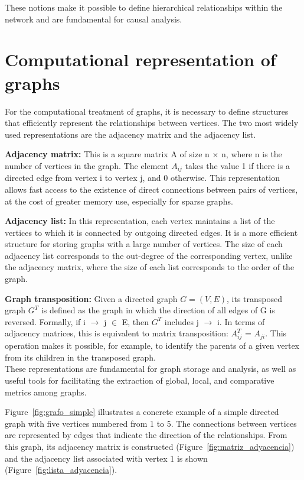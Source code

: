 \documentclass[12pt,a4paper]{report}
\begin{document}
These notions make it possible to define hierarchical relationships within the network and are fundamental for causal analysis.

\section{Computational representation of graphs}
	
For the computational treatment of graphs, it is necessary to define structures that efficiently represent the relationships between vertices. The two most widely used representations are the adjacency matrix and the adjacency list.

\textbf{Adjacency matrix:} This is a square matrix A of size n $\times$ n, where n is the number of vertices in the graph. The element $A_{ij}$ takes the value 1 if there is a directed edge from vertex i to vertex j, and 0 otherwise. This representation allows fast access to the existence of direct connections between pairs of vertices, at the cost of greater memory use, especially for sparse graphs.

\textbf{Adjacency list:} In this representation, each vertex maintains a list of the vertices to which it is connected by outgoing directed edges. It is a more efficient structure for storing graphs with a large number of vertices. The size of each adjacency list corresponds to the out-degree of the corresponding vertex, unlike the adjacency matrix, where the size of each list corresponds to the order of the graph.

\textbf{Graph transposition:} Given a directed graph $G=(V,E)$, its transposed graph $G^{T}$ is defined as the graph in which the direction of all edges of G is reversed. Formally, if i $\rightarrow$ j $\in$ E, then $G^{T}$ includes j $\rightarrow$ i. In terms of adjacency matrices, this is equivalent to matrix transposition: $A^{T}_{ij}$ = $A_{ji}$. This operation makes it possible, for example, to identify the parents of a given vertex from its children in the transposed graph.\\

These representations are fundamental for graph storage and analysis, as well as useful tools for facilitating the extraction of global, local, and comparative metrics among graphs. 

\noindent
Figure~\ref{fig:grafo_simple} illustrates a concrete example of a simple directed graph with five vertices numbered from 1 to 5. The connections between vertices are represented by edges that indicate the direction of the relationships. From this graph, its adjacency matrix is constructed (Figure~\ref{fig:matriz_adyacencia}) and the adjacency list associated with vertex 1 is shown (Figure~\ref{fig:lista_adyacencia}).\\
\end{document}
